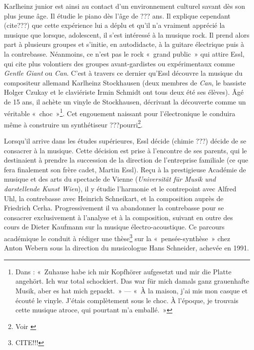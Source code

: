 \documentclass[a4paper,12pt]{article}
\newcommand{\guill}[1]{«~#1~»}
\begin{document}
Karlheinz junior est ainsi au contact d'un environnement culturel savant dès son plus jeune âge. Il étudie le piano dès l'âge de ??? ans. Il explique cependant (cite???) que cette expérience lui a déplu et qu'il n'a vraiment apprécié la musique que lorsque, adolescent, il s'est intéressé à la musique rock. Il prend alors part à plusieurs groupes et s'initie, en autodidacte, à la guitare électrique puis à la contrebasse. Néanmoins, ce n'est pas le rock \guill{grand public} qui attire Essl, qui cite plus volontiers des groupes avant-gardistes ou expérimentaux comme \emph{Gentle Giant} ou \emph{Can}. C'est à travers ce dernier qu'Essl découvre la musique du compositeur allemand Karlheinz Stockhausen (deux membres de \emph{Can}, le bassiste Holger Czukay et le claviériste Irmin Schmidt ont tous deux été ses élèves). Âgé de 15 ans, il achète un vinyle de Stockhausen, décrivant la découverte comme un véritable \guill{choc}\footnote{Dans \cite{OMNIA IN OMNIBUS: Behind the Scenes  ???}: \guill{Zuhause habe ich mir Kopfhörer aufgesetzt und mir die Platte angehört. Ich war total schockiert. Das war für mich damals ganz grauenhafte Musik, aber es hat mich gepackt.} --- \guill{À la maison, j'ai mis mon casque et écouté le vinyle. J'étais complètement sous le choc. À l'époque, je trouvais cette musique atroce, qui pourtant m'a emballé.}}. Cet engouement naissant pour l'électronique le conduira même à construire un synthétiseur ???pourri\footnote{Voir \cite{Rückblick / Vorschau - Der Komponist Karlheinz Essl im Gespräch mit Annelies Kühnelt}}.

Lorsqu'il arrive dans les études supérieures, Essl décide (chimie ???) décide de se consacrer à la musique. Cette décision est prise à l'encontre de ses parents, qui le destinaient à prendre la succession de la direction de l'entreprise familiale (ce que fera finalement son frère cadet, Martin Essl). Reçu à la prestigieuse Académie de musique et des arts du spectacle de Vienne (\emph{Universität für Musik und darstellende Kunst Wien}), il y étudie l'harmonie et le contrepoint avec Alfred Uhl, la contrebasse avec Heinrich Schneikart, et la composition auprès de Friedrich Cerha. Progressivement il va abandonner la contrebasse pour se consacrer exclusivement à l'analyse et à la composition, suivant en outre des cours de Dieter Kaufmann sur la musique électro-acoustique. 	Ce parcours académique le conduit à rédiger une thèse\footnote{CITE!!!} sur la \guill{pensée-synthèse} chez Anton Webern sous la direction du musicologue Hans Schneider, achevée en 1991.
\end{document}
